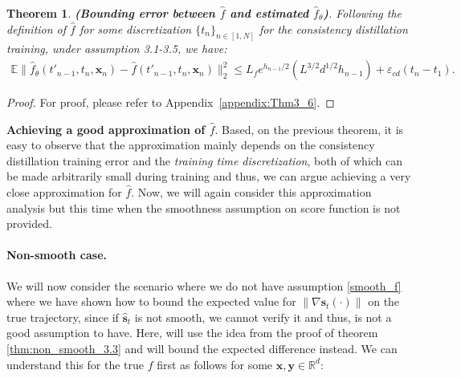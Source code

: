 \documentclass[11pt]{article}
\def\rvx{{\mathbf{x}}}
\def\rvy{{\mathbf{y}}}
\def\vs{{\bm{s}}}
\newtheorem{theorem}[lemma]{Theorem}
\begin{document}

\begin{theorem}
\label{thm:gap_f_hat_f_theta}
\textbf{(Bounding error between $\hat{f}$ and estimated $\hat{f}_\theta$)}. Following the definition of $\hat{f}$ for some discretization $\{t_n\}_{n\in [1,N]}$ for the consistency distillation training, 
under assumption 3.1-3.5, we have:
\begin{align*}
\mathbb{E} \|\hat{f}_\theta(t'_{n-1}, t_{n}, \rvx_n) - \hat{f}(t'_{n-1}, t_{n}, \rvx_n)\|^2_2 \leq  L_fe^{{h_{n-1}}/{2}}(L^{{3}/{2}}d^{{1}/{2}}h_{n-1}) + \varepsilon_{cd}(t_n-t_1).
\end{align*}
\end{theorem}
\begin{proof}
    For proof, please refer to Appendix~\ref{appendix:Thm3_6}.
\end{proof}
\noindent
\textbf{Achieving a good approximation of $\hat{f}$}. Based, on the previous theorem, it is easy to observe that the approximation mainly depends on the consistency distillation training error and the \textit{training time discretization}, both of which can be made arbitrarily small during training and thus, we can argue achieving a very close approximation for $\hat{f}$. Now, we will again consider this approximation analysis but this time when the smoothness assumption on score function is not provided.

\paragraph{Non-smooth case.} We will now consider the scenario where we do not have assumption \ref{smooth_f} where we have shown how to bound the expected value for $\|\nabla \vs_t(\cdot)\|$ on the true trajectory, since if $\hat{\vs}_t$ is not smooth, we cannot verify it and thus, is not a good assumption to have. Here, will use the idea from the proof of theorem \ref{thm:non_smooth_3.3} and will bound the expected difference instead. We can understand this for the true $f$ first as follows for some $\rvx, \rvy \in \mathbb{R}^d$:
\end{document}

